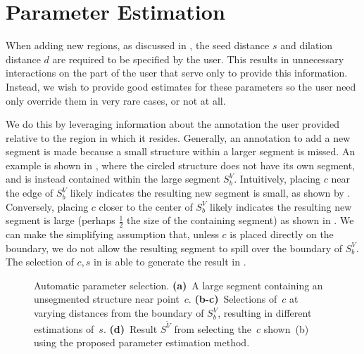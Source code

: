 \documentclass[]{spie}  %
\begin{document}
\section{Parameter Estimation}
\label{sec:param}

When adding new regions, as discussed in , the seed
distance $s$ and dilation distance $d$ are required to be specified by
the user.  This results in unnecessary interactions on the part of the
user that serve only to provide this information.  Instead, we wish to
provide good estimates for these parameters so the user need only
override them in very rare cases, or not at all.

We do this by leveraging information about the annotation the user
provided relative to the region in which it resides.  Generally, an
annotation to add a new segment is made because a small structure
within a larger segment is missed.  An example is shown in
, where the circled structure does not have its own
segment, and is instead contained within the large segment $S^V_b$.
Intuitively, placing $c$ near the edge of $S^V_b$ likely indicates the
resulting new segment is small, as shown by .
Conversely, placing $c$ closer to the center of $S^V_b$ likely
indicates the resulting new segment is large (perhaps $\frac{1}{2}$
the size of the containing segment) as shown in .  We
can make the simplifying assumption that, unless $c$ is placed
directly on the boundary, we do not allow the resulting segment to
spill over the boundary of $S^V_b$.  The selection of $c,s$ in
 is able to generate the result in .
\begin{figure}[htbp]
\centering
{}
\hspace{0.1em}

\hspace{0.1em}
\caption{Automatic parameter selection.  \textbf{(a)}~A large segment
  containing an unsegmented structure near point~$c$.
  \textbf{(b-c)}~Selections of~$c$ at varying distances from the
  boundary of $S^V_b$, resulting in different estimations of~$s$.
  \textbf{(d)}~Result $S^{\tilde{V}}$ from selecting the~$c$ shown~(b)
  using the proposed parameter estimation method.} \label{fig:param}
\end{figure}
\end{document}

